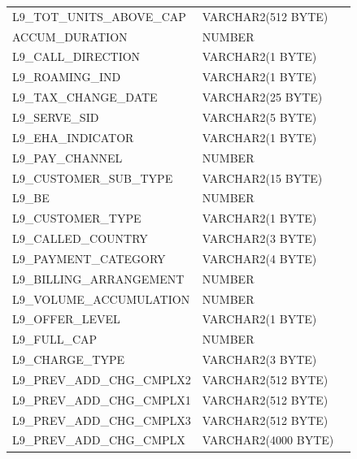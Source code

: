\documentclass[12pt,twoside]{article}
\begin{document}
\begin{longtable}{lll}
 L9\_TOT\_UNITS\_ABOVE\_CAP           &  VARCHAR2(512 BYTE)   &               \\
 ACCUM\_DURATION                      &  NUMBER               &               \\
 L9\_CALL\_DIRECTION                  &  VARCHAR2(1 BYTE)     &               \\
 L9\_ROAMING\_IND                     &  VARCHAR2(1 BYTE)     &               \\
 L9\_TAX\_CHANGE\_DATE                &  VARCHAR2(25 BYTE)    &               \\
 L9\_SERVE\_SID                       &  VARCHAR2(5 BYTE)     &               \\
 L9\_EHA\_INDICATOR                   &  VARCHAR2(1 BYTE)     &               \\
 L9\_PAY\_CHANNEL                     &  NUMBER               &               \\
 L9\_CUSTOMER\_SUB\_TYPE              &  VARCHAR2(15 BYTE)    &               \\
 L9\_BE                               &  NUMBER               &               \\
 L9\_CUSTOMER\_TYPE                   &  VARCHAR2(1 BYTE)     &               \\
 L9\_CALLED\_COUNTRY                  &  VARCHAR2(3 BYTE)     &               \\
 L9\_PAYMENT\_CATEGORY                &  VARCHAR2(4 BYTE)     &               \\
 L9\_BILLING\_ARRANGEMENT             &  NUMBER               &               \\
 L9\_VOLUME\_ACCUMULATION             &  NUMBER               &               \\
 L9\_OFFER\_LEVEL                     &  VARCHAR2(1 BYTE)     &               \\
 L9\_FULL\_CAP                        &  NUMBER               &               \\
 L9\_CHARGE\_TYPE                     &  VARCHAR2(3 BYTE)     &               \\
 L9\_PREV\_ADD\_CHG\_CMPLX2           &  VARCHAR2(512 BYTE)   &               \\
 L9\_PREV\_ADD\_CHG\_CMPLX1           &  VARCHAR2(512 BYTE)   &               \\
 L9\_PREV\_ADD\_CHG\_CMPLX3           &  VARCHAR2(512 BYTE)   &               \\
 L9\_PREV\_ADD\_CHG\_CMPLX            &  VARCHAR2(4000 BYTE)  &               \\

\end{longtable}
\end{document}

